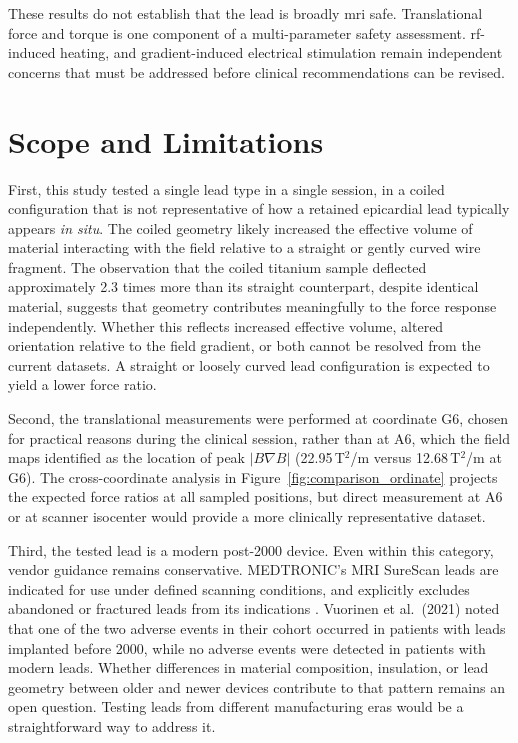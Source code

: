 These results do not establish that the lead is broadly \gls{mri} safe. Translational force and torque is one component of a multi-parameter safety assessment. \gls{rf}-induced heating, and gradient-induced electrical stimulation remain independent concerns that must be addressed before clinical recommendations can be revised.

\section{Scope and Limitations}

First, this study tested a single lead type in a single session, in a coiled configuration that is not representative of how a retained epicardial lead typically appears \emph{in situ}. The coiled geometry likely increased the effective volume of material interacting with the field relative to a straight or gently curved wire fragment. The observation that the coiled titanium sample deflected approximately 2.3 times more than its straight counterpart, despite identical material, suggests that geometry contributes meaningfully to the force response independently. Whether this reflects increased effective volume, altered orientation relative to the field gradient, or both cannot be resolved from the current datasets. A straight or loosely curved lead configuration is expected to yield a lower force ratio.

Second, the translational measurements were performed at coordinate G6, chosen for practical reasons during the clinical session, rather than at A6, which the field maps identified as the location of peak $|B\nabla B|$ (22.95\,T$^2$/m versus 12.68\,T$^2$/m at G6). The cross-coordinate analysis in Figure~\ref{fig:comparison_ordinate} projects the expected force ratios at all sampled positions, but direct measurement at A6 or at scanner isocenter would provide a more clinically representative dataset.

Third, the tested lead is a modern post-2000 device. Even within this category, vendor guidance remains conservative. MEDTRONIC's MRI SureScan\texttrademark{} leads are indicated for use under defined scanning conditions, and explicitly excludes abandoned or fractured leads from 
its indications \cite{medtronic_surescan}. Vuorinen et al.\ (2021)\cite{vuorinen2021} noted that one of the two adverse events in their cohort occurred in patients with leads implanted before 2000, while no adverse events were detected in patients with modern leads. Whether differences in material composition, insulation, or lead geometry between older and newer devices contribute to that pattern remains an open question. Testing leads from different manufacturing eras would be a straightforward way to address it.

